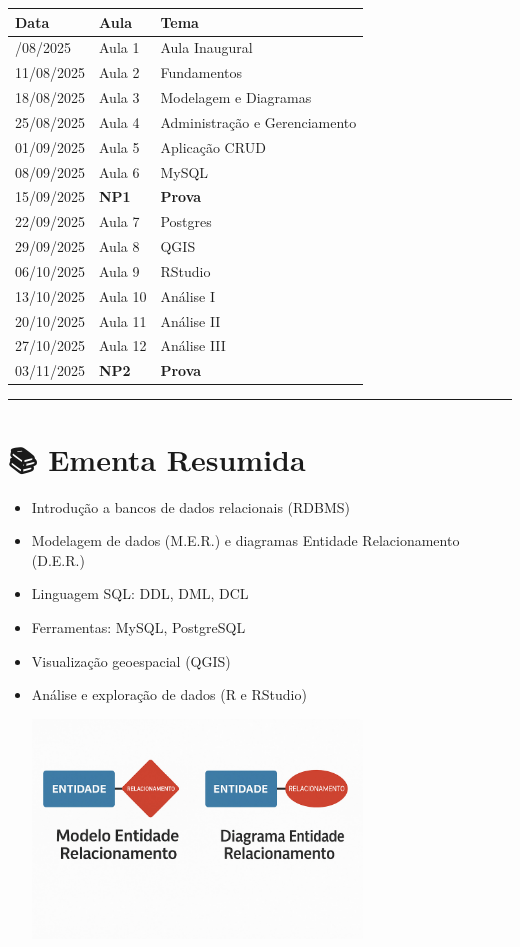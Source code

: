 \documentclass[
]{book}
\begin{document}
\begin{longtable}[]{@{}lll@{}}
\toprule\noalign{}
Data & Aula & Tema \\
\midrule\noalign{}
\endhead
\bottomrule\noalign{}
\endlastfoot
04/08/2025 & Aula 1 & Aula Inaugural \\
11/08/2025 & Aula 2 & Fundamentos \\
18/08/2025 & Aula 3 & Modelagem e Diagramas \\
25/08/2025 & Aula 4 & Administração e Gerenciamento \\
01/09/2025 & Aula 5 & Aplicação CRUD \\
08/09/2025 & Aula 6 & MySQL \\
15/09/2025 & \textbf{NP1} & \textbf{Prova} \\
22/09/2025 & Aula 7 & Postgres \\
29/09/2025 & Aula 8 & QGIS \\
06/10/2025 & Aula 9 & RStudio \\
13/10/2025 & Aula 10 & Análise I \\
20/10/2025 & Aula 11 & Análise II \\
27/10/2025 & Aula 12 & Análise III \\
03/11/2025 & \textbf{NP2} & \textbf{Prova} \\
\end{longtable}

\begin{center}\rule{0.5\linewidth}{0.5pt}\end{center}

\section{📚 Ementa Resumida}\label{ementa-resumida}

\begin{itemize}
\item
  Introdução a bancos de dados relacionais (RDBMS)
\item
  Modelagem de dados (M.E.R.) e diagramas Entidade Relacionamento (D.E.R.)
\item
  Linguagem SQL: DDL, DML, DCL
\item
  Ferramentas: MySQL, PostgreSQL
\item
  Visualização geoespacial (QGIS)
\item
  Análise e exploração de dados (R e RStudio)

  \includegraphics[width=3.44792in,height=\textheight]{images/2025-08-04/modelagem.jpg}
\end{itemize}
\end{document}
